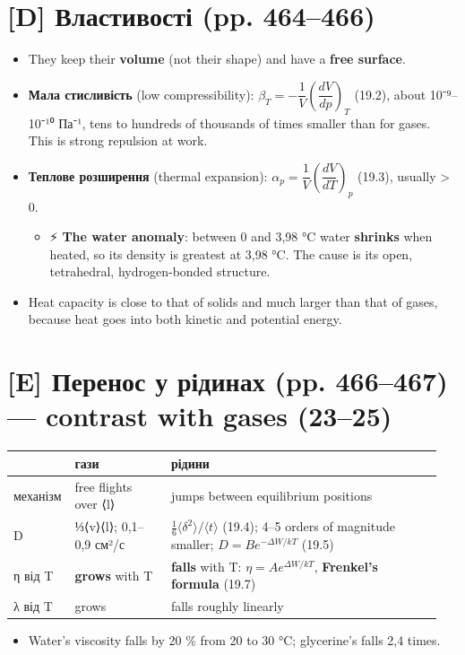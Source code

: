 \documentclass[11pt,a4paper,oneside]{book}
\newcommand{\spark}{{\sffamily\color{warncol}⚡}}
\begin{document}
\section*{[D] Властивості (pp. 464–466)}
\begin{itemize}
\item They keep their \textbf{volume} (not their shape) and have a \textbf{free surface}.
\item \textbf{Мала стисливість} (low compressibility): $\beta_T = -\dfrac1V\left(\dfrac{dV}{dp}\right)_T$ (19.2), about 10⁻⁹–10⁻¹⁰ Па⁻¹, tens to hundreds of thousands of times smaller than for gases. This is strong repulsion at work.
\item \textbf{Теплове розширення} (thermal expansion): $\alpha_p = \dfrac1V\left(\dfrac{dV}{dT}\right)_p$ (19.3), usually > 0.
\begin{itemize}
\item \spark{} \textbf{The water anomaly}: between 0 and 3,98 °C water \textbf{shrinks} when heated, so its density is greatest at 3,98 °C. The cause is its open, tetrahedral, hydrogen-bonded structure.
\end{itemize}
\item Heat capacity is close to that of solids and much larger than that of gases, because heat goes into both kinetic and potential energy.
\end{itemize}

\section*{[E] Перенос у рідинах (pp. 466–467) — contrast with gases (23–25)}
{\small
\begin{longtable}{>{\raggedright\arraybackslash}p{0.104\linewidth}>{\raggedright\arraybackslash}p{0.228\linewidth}>{\raggedright\arraybackslash}p{0.620\linewidth}}
\toprule
\textbf{} & \textbf{гази} & \textbf{рідини} \\
\midrule
\endhead
механізм & free flights over ⟨l⟩ & jumps between equilibrium positions \\
D & ⅓⟨v⟩⟨l⟩; 0,1–0,9 см²/с & $\tfrac16\langle\delta^2\rangle/\langle t\rangle$ (19.4); 4–5 orders of magnitude smaller; $D = Be^{-\Delta W/kT}$ (19.5) \\
η від T & \textbf{grows} with T & \textbf{falls} with T: $\eta = Ae^{\Delta W/kT}$, \textbf{Frenkel's formula} (19.7) \\
λ від T & grows & falls roughly linearly \\
\bottomrule
\end{longtable}
}
\begin{itemize}
\item Water's viscosity falls by 20 \% from 20 to 30 °C; glycerine's falls 2,4 times.
\end{itemize}
\end{document}
